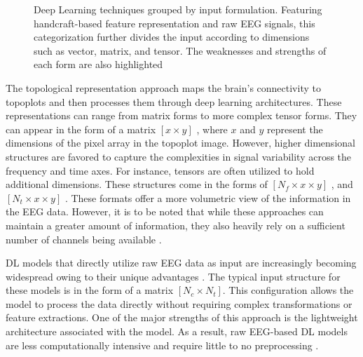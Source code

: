 \begin{figure}[h!]
    \centering
        \caption{Deep Learning techniques grouped by input formulation. Featuring handcraft-based feature representation and raw EEG signals, this categorization further divides the input according to dimensions such as vector, matrix, and tensor. The weaknesses and strengths of each form are also highlighted \label{fig:sota2_input}}
\end{figure}

The topological representation approach maps the brain's connectivity to topoplots and then processes them through deep learning architectures. These representations can range from matrix forms to more complex tensor forms. They can appear in the form of a matrix $[x \times y]$ \cite{xu2020learning}, where $x$ and $y$ represent the dimensions of the pixel array in the topoplot image. However, higher dimensional structures are favored to capture the complexities in signal variability across the frequency and time axes. For instance, tensors are often utilized to hold additional dimensions. These structures come in the forms of $[N_f \times x \times y]$ \cite{li2019novel}, and $[N_t \times x \times y]$ \cite{liu2021densely}. These formats offer a more volumetric view of the information in the EEG data. However, it is to be noted that while these approaches can maintain a greater amount of information, they also heavily rely on a sufficient number of channels being available \cite{zhao2019imaging}.

DL models that directly utilize raw EEG data as input are increasingly becoming widespread owing to their unique advantages \cite{dose2018end}. The typical input structure for these models is in the form of a matrix $[N_c \times N_t]$. This configuration allows the model to process the data directly without requiring complex transformations or feature extractions. One of the major strengths of this approach is the lightweight architecture associated with the model. As a result, raw EEG-based DL models are less computationally intensive and require little to no preprocessing \cite{amin2019deep}.

